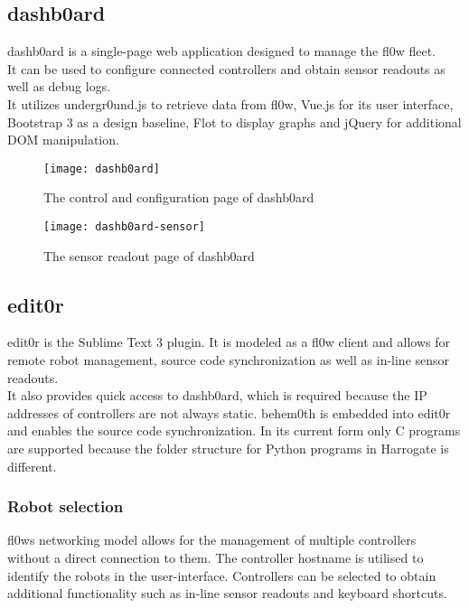 \documentclass[conference,a4paper]{IEEEtran}
\begin{document}
\subsection{dashb0ard}
dashb0ard\cite{dashb0ard:Sebastian Schaffler} is a single-page web application designed to manage the fl0w\cite{fl0w:Philip Trauner} fleet.\\ It can be used to configure connected controllers and obtain sensor readouts as well as debug logs. \\It utilizes undergr0und.js\cite{undergr0und.js:Philip Trauner} to retrieve data from fl0w, Vue.js\cite{Vue:Evan You} for its user interface, Bootstrap 3\cite{Bootstrap 3:Twitter Inc.} as a design baseline, Flot\cite{Flot:David Schnur} to display graphs and jQuery\cite{jQuery:jQuery Foundation} for additional DOM manipulation.

\begin{figure}[H]
\centering
\texttt{[image: dashb0ard]}
\caption{The control and configuration page of dashb0ard\cite{Sublime Text 3:Sublime HQ}}
\label{fig:dashb0ard_config}
\end{figure}

\begin{figure}[H]
\centering
\texttt{[image: dashb0ard-sensor]}
\caption{The sensor readout page of dashb0ard\cite{Sublime Text 3:Sublime HQ}}
\label{fig:dashb0ard_sensor}
\end{figure}
\subsection{edit0r}
edit0r\cite{edit0r:Philip Trauner} is the Sublime Text 3\cite{Sublime Text 3:Sublime HQ} plugin. It is modeled as a fl0w\cite{fl0w:Philip Trauner} client and allows for remote robot management, source code synchronization as well as in-line sensor readouts. \\It also provides quick access to dashb0ard\cite{dashb0ard:Sebastian Schaffler}, which is required because the IP addresses of controllers are not always static. behem0th\cite{behem0th:Christoph Heiss} is embedded into edit0r and enables the source code synchronization. In its current form only C programs are supported because the folder structure for Python\cite{Python:Python Foundation} programs in Harrogate\cite{Harrogate:KIPR} is different.\\

\subsubsection{Robot selection}
fl0ws\cite{fl0w:Philip Trauner} networking model allows for the management of multiple controllers without a direct connection to them. The controller hostname is utilised to identify the robots in the user-interface. Controllers can be selected to obtain additional functionality such as in-line sensor readouts and keyboard shortcuts.\\
\end{document}
